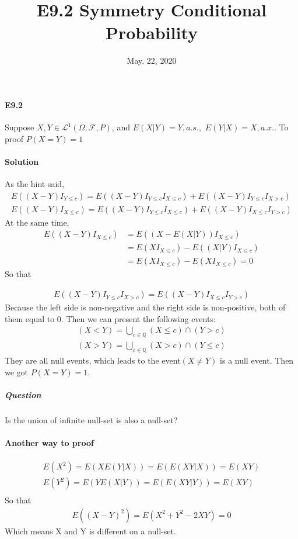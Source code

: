 \documentclass[UTF8]{ctexart}
\theoremstyle{definition}
\begin{document}
\title{E9.2 Symmetry Conditional Probability}
\date{May. 22, 2020}

\maketitle
\paragraph{E9.2 } Suppose $X,Y \in \mathcal{L}^1(\Omega,\mathcal{F},P)$, and $E(X|Y) = Y,a.s.,$  $E(Y|X) = X,a.x..$ To proof $P(X=Y)=1$
\paragraph{Solution}
As the hint said,
\begin{align*}
	E((X-Y)I_{Y\leq c}) = E((X-Y)I_{Y\leq c}I_{X\leq c}) + E((X-Y)I_{Y\leq c}I_{X>c})\\
	E((X-Y)I_{X\leq c}) = E((X-Y)I_{Y\leq c}I_{X\leq c}) + E((X-Y)I_{X\leq c}I_{Y>c})
\end{align*}
At the same time,
\begin{align*}
	E((X-Y)I_{X\leq c}) &= E((X-E(X|Y))I_{X\leq c})\\&= E(XI_{X\leq c}) - E((X|Y)I_{X\leq c})\\&= E(XI_{X\leq c}) - E(XI_{X\leq c}) = 0
\end{align*}
So that

\begin{align*}
	 E((X-Y)I_{Y\leq c}I_{X>c}) = E((X-Y)I_{X\leq c}I_{Y>c})
\end{align*}
Because the left side is non-negative and the right side is non-positive, both of them equal to 0. Then we can present the following events:
\begin{align*}
	(X<Y) = \bigcup_{c\in \mathbb{Q}}(X\leq c)\cap (Y > c)\\
	(X>Y) = \bigcup_{c\in \mathbb{Q}}(X > c)\cap (Y \leq c)
\end{align*}
They are all null events, which leads to the event$(X\neq Y)$ is a null event. Then we got $P(X = Y) = 1$.
\subparagraph{Question} Is the union of infinite null-set is also a null-set?
\paragraph{Another way to proof} 
\begin{align*}
	E(X^2) = E(X E(Y|X)) = E(E(XY|X)) = E(XY)\\
	E(Y^2) = E(Y E(X|Y)) = E(E(XY|Y)) = E(XY)\\
\end{align*}
So that
\begin{align*}
	E((X-Y)^2) = E(X^2 + Y^2 - 2XY) = 0
\end{align*}
Which means X and Y is different on a null-set.
\end{document}
